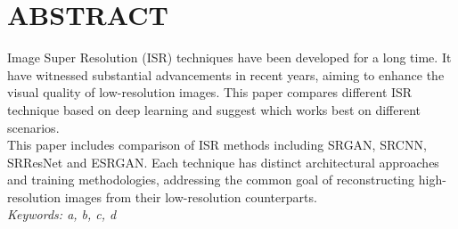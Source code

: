 \newpage

\section*{ABSTRACT}
Image Super Resolution (ISR) techniques have been developed for a long time. It have witnessed substantial advancements in recent years, aiming to enhance the visual quality of low-resolution images. This paper compares different ISR technique based on deep learning and suggest which works best on different scenarios.\\
This paper includes comparison of ISR methods including SRGAN, SRCNN, SRResNet and ESRGAN. Each technique has distinct architectural approaches and training methodologies, addressing the common goal of reconstructing high-resolution images from their low-resolution counterparts.
\\
\textit {Keywords:  a, b, c, d }